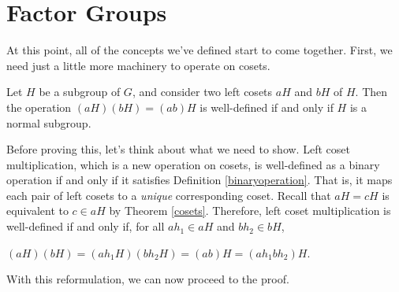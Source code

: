 \section{Factor Groups}

At this point, all of the concepts we've defined start to come together. First, we need just a little more machinery to operate on cosets.


\begin{theorem}
Let $H$ be a subgroup of $G$, and consider two left cosets $aH$ and $bH$ of $H$. Then the operation $(aH)(bH) = (ab)H$ is well-defined if and only if $H$ is a normal subgroup.
\end{theorem}

Before proving this, let's think about what we need to show. Left coset multiplication, which is a new operation on cosets, is well-defined as a binary operation if and only if it satisfies Definition \ref{binaryoperation}. That is, it maps each pair of left cosets to a \textit{unique} corresponding coset. Recall that $aH = cH$ is equivalent to $c \in aH$ by Theorem \ref{cosets}. Therefore, left coset multiplication is well-defined if and only if, for all $ah_1 \in aH$ and $bh_2 \in bH$,

\begin{center}
    $(aH)(bH) = (ah_1H)(bh_2H) = (ab)H = (ah_1bh_2)H$.
\end{center}

With this reformulation, we can now proceed to the proof.

